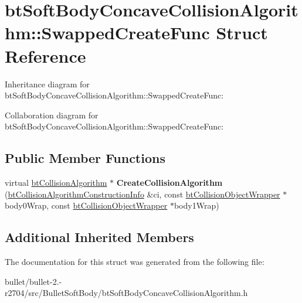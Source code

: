 \hypertarget{structbt_soft_body_concave_collision_algorithm_1_1_swapped_create_func}{\section{bt\+Soft\+Body\+Concave\+Collision\+Algorithm\+:\+:Swapped\+Create\+Func Struct Reference}
\label{structbt_soft_body_concave_collision_algorithm_1_1_swapped_create_func}
}


Inheritance diagram for bt\+Soft\+Body\+Concave\+Collision\+Algorithm\+:\+:Swapped\+Create\+Func\+:


Collaboration diagram for bt\+Soft\+Body\+Concave\+Collision\+Algorithm\+:\+:Swapped\+Create\+Func\+:
\subsection*{Public Member Functions}
\begin{DoxyCompactItemize}
\item 
\hypertarget{structbt_soft_body_concave_collision_algorithm_1_1_swapped_create_func_a601400d940d5de6a843839a2e198c777}{virtual \hyperlink{classbt_collision_algorithm}{bt\+Collision\+Algorithm} $\ast$ {\bfseries Create\+Collision\+Algorithm} (\hyperlink{structbt_collision_algorithm_construction_info}{bt\+Collision\+Algorithm\+Construction\+Info} \&ci, const \hyperlink{structbt_collision_object_wrapper}{bt\+Collision\+Object\+Wrapper} $\ast$body0\+Wrap, const \hyperlink{structbt_collision_object_wrapper}{bt\+Collision\+Object\+Wrapper} $\ast$body1\+Wrap)}\label{structbt_soft_body_concave_collision_algorithm_1_1_swapped_create_func_a601400d940d5de6a843839a2e198c777}

\end{DoxyCompactItemize}
\subsection*{Additional Inherited Members}


The documentation for this struct was generated from the following file\+:\begin{DoxyCompactItemize}
\item 
bullet/bullet-\/2.-\/r2704/src/\+Bullet\+Soft\+Body/bt\+Soft\+Body\+Concave\+Collision\+Algorithm.\+h\end{DoxyCompactItemize}
